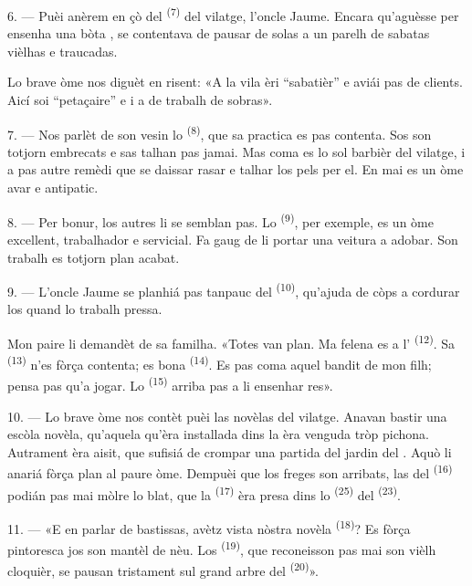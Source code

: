 6. --- Puèi anèrem en çò del  \textsuperscript{(7)} del vilatge,
l'oncle Jaume. Encara qu'aguèsse per ensenha una bòta , se
contentava de pausar de solas a un parelh de sabatas vièlhas e traucadas.

Lo brave òme nos diguèt en risent: «A la vila èri “sabatièr” e aviái pas de
clients. Aicí soi “petaçaire” e i a de trabalh de sobras».

7. --- Nos parlèt de son vesin lo  \textsuperscript{(8)}, que sa
practica es pas contenta. Sos  son totjorn embrecats e sas
 talhan pas jamai. Mas coma es lo sol barbièr del vilatge, i a pas
autre remèdi que se daissar rasar e talhar los pels per el. En mai es un òme avar
e antipatic.

8. --- Per bonur, los autres  li se semblan pas. Lo
 \textsuperscript{(9)}, per exemple, es un òme excellent,
trabalhador e servicial. Fa gaug de li portar una veitura a adobar. Son trabalh es
totjorn plan acabat.

9. --- L'oncle Jaume se planhiá pas tanpauc del 
\textsuperscript{(10)}, qu'ajuda de còps a cordurar los  quand lo
trabalh pressa.

Mon paire li demandèt de sa familha. «Totes van plan. Ma felena es a
l' \textsuperscript{(12)}. Sa 
\textsuperscript{(13)} n'es fòrça contenta; es bona 
\textsuperscript{(14)}. Es pas coma aquel bandit de mon filh; pensa pas qu'a
jogar. Lo  \textsuperscript{(15)} arriba pas a li ensenhar res».

\VUsaut{3.0mm}
\VUsaut{3.0mm}

10. --- Lo brave òme nos contèt puèi las novèlas del vilatge. Anavan bastir una
escòla novèla, qu'aquela qu'èra installada dins la  èra venguda
tròp pichona. Autrament èra aisit, que sufisiá de crompar una partida del jardin
del . Aquò li anariá fòrça plan al paure òme. Dempuèi que los
freges son arribats, las  del  \textsuperscript{(16)}
podián pas mai mòlre lo blat, que la  \textsuperscript{(17)} èra
presa dins lo  \textsuperscript{(25)} del 
\textsuperscript{(23)}.

11. --- «E en parlar de bastissas, avètz vista nòstra novèla 
\textsuperscript{(18)}? Es fòrça pintoresca jos son mantèl de nèu. Los
 \textsuperscript{(19)}, que reconeisson pas mai son vièlh
cloquièr, se pausan tristament sul grand arbre del 
\textsuperscript{(20)}».

